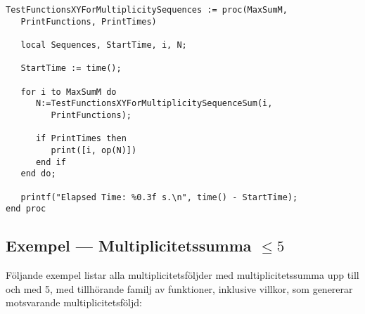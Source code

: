\begin{verbatim}
TestFunctionsXYForMultiplicitySequences := proc(MaxSumM,
   PrintFunctions, PrintTimes)

   local Sequences, StartTime, i, N;

   StartTime := time();

   for i to MaxSumM do
      N:=TestFunctionsXYForMultiplicitySequenceSum(i, 
         PrintFunctions);
         
      if PrintTimes then
         print([i, op(N)])
      end if
   end do;

   printf("Elapsed Time: %0.3f s.\n", time() - StartTime);
end proc
\end{verbatim}

\subsection{Exempel --- Multiplicitetssumma $\leq 5$}

Följande exempel listar alla multiplicitetsföljder med multiplicitetssumma upp till och med 5, med tillhörande familj av funktioner, inklusive villkor, som genererar motsvarande multiplicitetsföljd:

